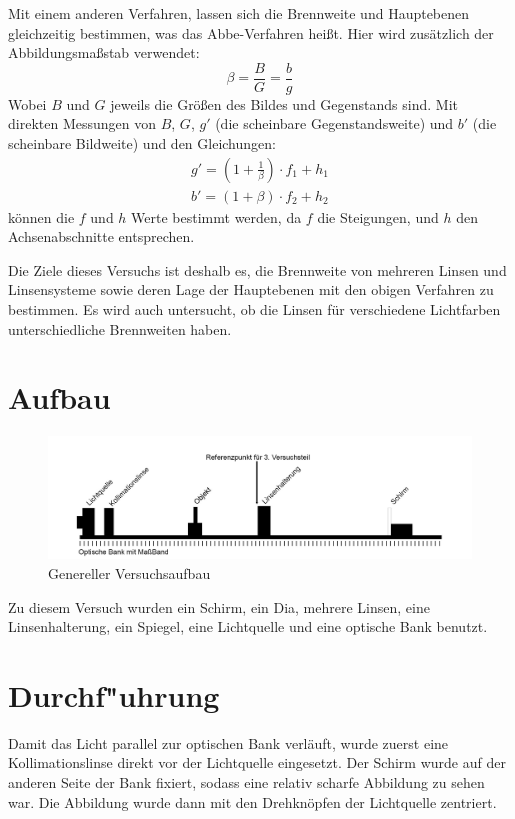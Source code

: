 \documentclass[11pt,a4paper]{article}
\begin{document}
Mit einem anderen Verfahren, lassen sich die Brennweite und Hauptebenen gleichzeitig bestimmen, was das Abbe-Verfahren heißt. Hier wird zusätzlich der Abbildungsmaßstab verwendet: 
$$ \beta = \frac{B}{G} = \frac{b}{g}$$
Wobei $B$ und $G$ jeweils die Größen des Bildes und Gegenstands sind. 
Mit direkten Messungen von $B$, $G$, $g'$ (die scheinbare Gegenstandsweite) und $b'$ (die scheinbare Bildweite) und den Gleichungen:
\begin{equation}
\begin{array}{l}
	g' = (1+\frac{1}{\beta})\cdot f_1 + h_1 \\
	b' = (1+\beta)\cdot f_2 + h_2
\end{array}
\end{equation}
können die $f$ und $h$ Werte bestimmt werden, da $f$ die Steigungen, und $h$ den Achsenabschnitte entsprechen. 

Die Ziele dieses Versuchs ist deshalb es, die Brennweite von mehreren Linsen und Linsensysteme sowie deren Lage der Hauptebenen mit den obigen Verfahren zu bestimmen. Es wird auch untersucht, ob die Linsen für verschiedene Lichtfarben unterschiedliche Brennweiten haben. 

\section{Aufbau}
\begin{figure}[h]
	\centering
	\includegraphics[width=\linewidth]{Aufbau}
	\caption{Genereller Versuchsaufbau}
\end{figure}
Zu diesem Versuch wurden ein Schirm, ein Dia, mehrere Linsen, eine Linsenhalterung, ein Spiegel, eine Lichtquelle und eine optische Bank benutzt. 

\section{Durchf"uhrung}
Damit das Licht parallel zur optischen Bank verläuft, wurde zuerst eine Kollimationslinse direkt vor der Lichtquelle eingesetzt. Der Schirm wurde auf der anderen Seite der Bank fixiert, sodass eine relativ scharfe Abbildung zu sehen war. Die Abbildung wurde dann mit den Drehknöpfen der Lichtquelle zentriert. 
\end{document}

